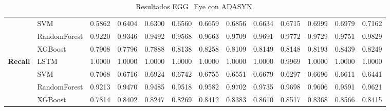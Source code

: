 \begin{table}[h]
\begin{adjustbox}{max width=15cm}
\begin{tabular}{|c|l|r|r|r|r|r|r|r|r|r|r|r|}
	& SVM &  0.5862 &  0.6404 &  0.6300 &  0.6560 &  0.6659 &  0.6856 &  0.6634 &  0.6715 &  0.6999 &  0.6979 &  0.7162 \\
	& RandomForest &  0.9220 &  0.9346 &  0.9492 &  0.9568 &  0.9663 &  0.9709 &  0.9691 &  0.9772 &  0.9729 &  0.9751 &  0.9829 \\
	& XGBoost &  0.7908 &  0.7796 &  0.7888 &  0.8138 &  0.8258 &  0.8109 &  0.8149 &  0.8148 &  0.8193 &  0.8439 &  0.8249 \\
	\hline
	\textbf{Recall} & LSTM &  1.0000 &  1.0000 &  1.0000 &  1.0000 &  1.0000 &  1.0000 &  1.0000 &  0.9969 &  1.0000 &  1.0000 &  1.0000 \\
	& SVM &  0.7068 &  0.6716 &  0.6924 &  0.6742 &  0.6755 &  0.6551 &  0.6679 &  0.6297 &  0.6696 &  0.6611 &  0.6441 \\
	& RandomForest &  0.9213 &  0.9470 &  0.9485 &  0.9518 &  0.9582 &  0.9702 &  0.9735 &  0.9698 &  0.9606 &  0.9591 &  0.9621 \\
	& XGBoost &  0.7814 &  0.8402 &  0.8247 &  0.8269 &  0.8412 &  0.8383 &  0.8610 &  0.8517 &  0.8368 &  0.8566 &  0.8415 \\
\hline
\end{tabular}
\end{adjustbox}
\caption{Resultados EGG\_Eye con ADASYN.}
\label{tab:EGGEyeADASYN}
\end{table}
